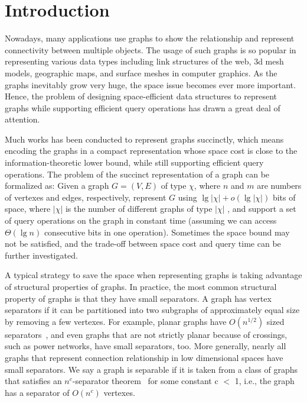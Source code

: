 \documentclass[12pt,glossary]{dalthesis}
\begin{document}
\mainmatter

\chapter{Introduction}

Nowadays, many applications use graphs to show the relationship and represent connectivity between multiple objects. The usage of such graphs is so popular in representing various data types including link structures of the web, 3d mesh models, geographic maps, and surface meshes in computer graphics. As the graphs inevitably grow very huge, the space issue becomes ever more important. Hence, the problem of designing space-efficient data structures to represent graphs while supporting efficient query operations has drawn a great deal of attention. 

\bigskip
Much works has been conducted to represent graphs succinctly, which means encoding the graphs in a compact representation whose space cost is close to the information-theoretic lower bound, while still supporting efficient query operations. The problem of the succinct representation of a graph can be formalized as: Given a graph $G = (V, E)$ of type $\chi$, where $n$ and $m$ are numbers of vertexes and edges, respectively, represent $G$ using $\lg | \chi | + o(\lg | \chi | )$ bits of space, where $|\chi|$ is the number of different graphs of type $|\chi|$ , and support a set of query operations on the graph in constant time (assuming we can access $\Theta(\lg n)$ consecutive bits in one operation). Sometimes the space bound may not be satisfied, and the trade-off between space cost and query time can be further investigated.  

\bigskip


A typical strategy to save the space when representing graphs is taking advantage of structural properties of graphs. In practice, the most common structural property of graphs is that they have small separators. A graph has vertex separators if it can be partitioned into two subgraphs of approximately equal size by removing a few vertexes. For example, planar graphs have $O(n^{1/2})$ sized separators~\cite{separator-theorem}, and even graphs that are not strictly planar because of crossings, such as power networks, have small separators, too. More generally, nearly all graphs that represent connection relationship in low dimensional spaces have small separators. We say a graph is separable if it is taken from a class of graphs that satisfies an $n^{c}$-separator theorem~\cite{separator-theorem} for some constant c $<$ 1, i.e., the graph has a separator of $O(n^{c})$ vertexes.
\end{document}
